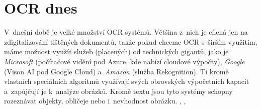 \documentclass[12pt,oneside]{report}			%
\begin{document}
	\section{OCR dnes}
	\label{sec:ocr_today}
	V~dnešní době je velké množství \gls{OCR} systémů. Většina z~nich je cílená jen na zdigitalizování tištěných dokumentů, takže pokud chceme \gls{OCR} s~širším využitím, máme možnost využít služeb (placených) od technických gigantů, jako je \emph{Microsoft} (počítačové vidění pod Azure, kde nabízí cloudové výpočty), \emph{Google} (Vison AI pod Google Cloud) a~\emph{Amazon} (služba Rekognition). Ti kromě vlastních speciálních algoritmů využívají svých obrovských výpočetních kapacit a~zapůjčují je k~analýze obrázků. Kromě textu jsou tyto systémy schopny rozeznávat objekty, obličeje nebo i~nevhodnost obrázku. \parencite{MS_CV}, \parencite{Google_CV}, \parencite{Amazon_CV}
	
	
	
\end{document}
